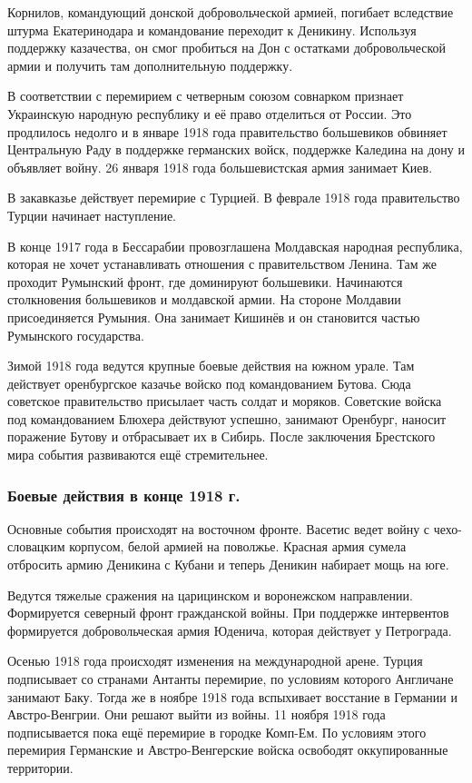 Корнилов, командующий донской добровольческой армией, погибает вследствие штурма Екатеринодара и командование переходит к Деникину. Используя поддержку казачества, он смог пробиться на Дон с остатками добровольческой армии и получить там дополнительную поддержку. 

В соответствии с перемирием с четверным союзом совнарком признает Украинскую народную республику и её право отделиться от России. Это продлилось недолго и в январе 1918 года правительство большевиков обвиняет Центральную Раду в поддержке германских войск, поддержке Каледина на дону и объявляет войну. 26 января 1918 года большевистская армия занимает Киев.

В закавказье действует перемирие с Турцией. В феврале 1918 года правительство Турции начинает наступление.

В конце 1917 года в Бессарабии провозглашена Молдавская народная республика, которая не хочет устанавливать отношения с правительством Ленина. Там же проходит Румынский фронт, где доминируют большевики. Начинаются столкновения большевиков и молдавской армии. На стороне Молдавии присоединяется Румыния. Она занимает Кишинёв и он становится частью Румынского государства.

Зимой 1918 года ведутся крупные боевые действия на южном урале. Там действует оренбургское казачье войско под командованием Бутова. Сюда советское правительство присылает часть солдат и моряков. Советские войска под командованием Блюхера действуют успешно, занимают Оренбург, наносит поражение Бутову и отбрасывает их в Сибирь.
После заключения Брестского мира события развиваются ещё стремительнее.

\subsubsection{Боевые действия в конце 1918 г.}

Основные события происходят на восточном фронте. Васетис ведет войну с чехо-словацким корпусом, белой армией на поволжье.
Красная армия сумела отбросить армию Деникина с Кубани и теперь Деникин набирает мощь на юге.

Ведутся тяжелые сражения на царицинском и воронежском направлении. 
Формируется северный фронт гражданской войны. При поддержке интервентов формируется добровольческая армия Юденича, которая действует у Петрограда.

Осенью 1918 года происходят изменения на международной арене. Турция подписывает со странами Антанты перемирие, по условиям которого Англичане занимают Баку. Тогда же в ноябре 1918 года вспыхивает восстание в Германии и Австро-Венгрии. Они решают выйти из войны. 11 ноября 1918 года подписывается пока ещё перемирие в городке Комп-Ем. По условиям этого перемирия Германские и Австро-Венгерские войска освободят оккупированные территории.

